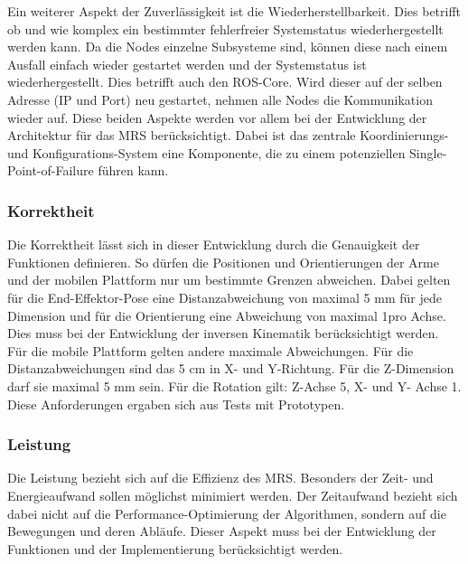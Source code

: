 Ein weiterer Aspekt der Zuverlässigkeit ist die Wiederherstellbarkeit. Dies betrifft ob und wie komplex ein bestimmter fehlerfreier Systemstatus wiederhergestellt werden kann. Da die Nodes einzelne Subsysteme sind, können diese nach einem Ausfall einfach wieder gestartet werden und der Systemstatus ist wiederhergestellt. Dies betrifft auch den ROS-Core. Wird dieser auf der selben Adresse (IP und Port) neu gestartet, nehmen alle Nodes die Kommunikation wieder auf. Diese beiden Aspekte werden vor allem bei der Entwicklung der Architektur für das MRS berücksichtigt. Dabei ist das zentrale Koordinierungs- und Konfigurations-System eine Komponente, die zu einem potenziellen Single-Point-of-Failure führen kann.


\subsubsection{Korrektheit}
Die Korrektheit lässt sich in dieser Entwicklung durch die Genauigkeit der Funktionen definieren. So dürfen die Positionen und Orientierungen der Arme und der mobilen Plattform nur um bestimmte Grenzen abweichen. Dabei gelten für die End-Effektor-Pose eine Distanzabweichung von maximal 5 mm für jede Dimension und für die Orientierung eine Abweichung von maximal 1\textdegree pro Achse. Dies muss bei der Entwicklung der inversen Kinematik berücksichtigt werden. Für die mobile Plattform gelten andere maximale Abweichungen. Für die Distanzabweichungen sind das 5 cm in X- und Y-Richtung. Für die Z-Dimension darf sie maximal 5 mm sein. Für die Rotation gilt: Z-Achse 5\textdegree, X- und Y- Achse 1\textdegree. Diese Anforderungen ergaben sich aus Tests mit Prototypen.

\subsubsection{Leistung}
Die Leistung bezieht sich auf die Effizienz des MRS. Besonders der Zeit- und Energieaufwand sollen möglichst minimiert werden. Der Zeitaufwand bezieht sich dabei nicht auf die Performance-Optimierung der Algorithmen, sondern auf die Bewegungen und deren Abläufe. Dieser Aspekt muss bei der Entwicklung der Funktionen und der Implementierung berücksichtigt werden. 

